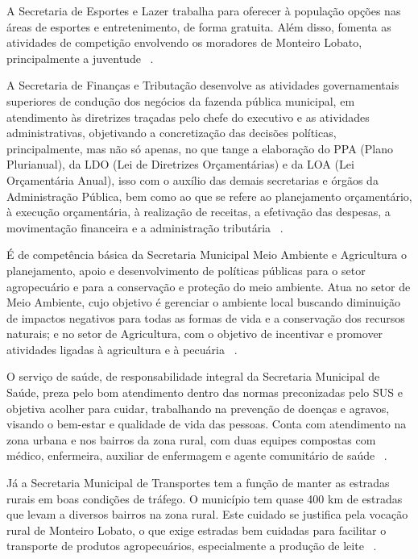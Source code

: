 A Secretaria de Esportes e Lazer trabalha para oferecer à população opções nas áreas de esportes e entretenimento, de forma gratuita. Além disso, fomenta as atividades de competição envolvendo os moradores de Monteiro Lobato, principalmente a juventude ~\cite{MonteiroLobatoSite}.

A Secretaria de Finanças e Tributação desenvolve as atividades governamentais superiores de condução dos negócios da fazenda pública municipal, em atendimento às diretrizes traçadas pelo chefe do executivo e as atividades administrativas, objetivando a concretização das decisões políticas, principalmente, mas não só apenas, no que tange a elaboração do PPA (Plano Plurianual), da LDO (Lei de Diretrizes Orçamentárias) e da LOA (Lei Orçamentária Anual), isso com o auxílio das demais secretarias e órgãos da Administração Pública, bem como ao que se refere ao planejamento orçamentário, à execução orçamentária, à realização de receitas, a efetivação das despesas, a movimentação financeira e a administração tributária ~\cite{MonteiroLobatoSite}.

É de competência básica da Secretaria Municipal Meio Ambiente e Agricultura o planejamento, apoio e desenvolvimento de políticas públicas para o setor agropecuário e para a conservação e proteção do meio ambiente. Atua no setor de Meio Ambiente, cujo objetivo é gerenciar o ambiente local buscando diminuição de impactos negativos para todas as formas de vida e a conservação dos recursos naturais; e no setor de Agricultura, com o objetivo de incentivar e promover atividades ligadas à agricultura e à pecuária ~\cite{MonteiroLobatoSite}.

O serviço de saúde, de responsabilidade integral da Secretaria Municipal de Saúde, preza pelo bom atendimento dentro das normas preconizadas pelo SUS e objetiva acolher para cuidar, trabalhando na prevenção de doenças e agravos, visando o bem-estar e qualidade de vida das pessoas. Conta com atendimento na zona urbana e nos bairros da zona rural, com duas equipes compostas com médico, enfermeira, auxiliar de enfermagem e agente comunitário de saúde ~\cite{MonteiroLobatoSite}.

Já a Secretaria Municipal de Transportes tem a função de manter as estradas rurais em boas condições de tráfego. O município tem quase 400 km de estradas que levam a diversos bairros na zona rural. Este cuidado se justifica pela vocação rural de Monteiro Lobato, o que exige estradas bem cuidadas para facilitar o transporte de produtos agropecuários, especialmente a produção de leite ~\cite{MonteiroLobatoSite}.

